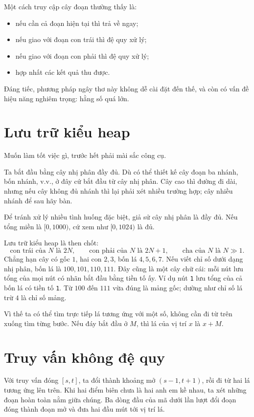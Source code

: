 \documentclass[11pt]{article}
\begin{document}
Một cách truy cập cây đoạn thường thấy là:
\begin{itemize}
  \item nếu cần cả đoạn hiện tại thì trả về ngay;
  \item nếu giao với đoạn con trái thì đệ quy xử lý;
  \item nếu giao với đoạn con phải thì đệ quy xử lý;
  \item hợp nhất các kết quả thu được.
\end{itemize}
Đáng tiếc, phương pháp ngây thơ này không dễ cài đặt đến thế, và còn có vấn đề
hiệu năng nghiêm trọng: hằng số quá lớn.

\section{Lưu trữ kiểu heap}

Muốn làm tốt việc gì, trước hết phải mài sắc công cụ.

Ta bắt đầu bằng cây nhị phân đầy đủ.  Dù có thể thiết kế cây đoạn ba nhánh,
bốn nhánh, v.v., ở đây cứ bắt đầu từ cây nhị phân.  Cây cao thì đường đi dài,
nhưng nếu cây không đủ nhánh thì lại phải xét nhiều trường hợp; cây nhiều nhánh
để sau hãy bàn.

Để tránh xử lý nhiều tình huống đặc biệt, giả sử cây nhị phân là đầy đủ.  Nếu
tổng miền là $[0,1000)$, cứ xem như $[0,1024)$ là đủ.

Lưu trữ kiểu heap là then chốt:
\[
  \text{con trái của }N\text{ là }2N,\qquad
  \text{con phải của }N\text{ là }2N+1,\qquad
  \text{cha của }N\text{ là }N \gg 1.
\]
Chẳng hạn cây có gốc $1$, hai con $2,3$, bốn lá $4,5,6,7$.  Nếu viết chỉ số
dưới dạng nhị phân, bốn lá là $100,101,110,111$.  Đây cũng là một cây chữ cái:
mỗi nút lưu tổng của mọi nút có nhãn bắt đầu bằng tiền tố ấy.  Ví dụ nút
\texttt{1} lưu tổng của cả bốn lá có tiền tố \texttt{1}.  Từ $100$ đến $111$
vừa đúng là mảng gốc; dường như chỉ số lá trừ $4$ là chỉ số mảng.

Vì thế ta có thể tìm trực tiếp lá tương ứng với một số, không cần đi từ trên
xuống tìm từng bước.  Nếu đáy bắt đầu ở $M$, thì lá của vị trí $x$ là $x+M$.

\section{Truy vấn không đệ quy}

Với truy vấn đóng $[s,t]$, ta đổi thành khoảng mở $(s-1,t+1)$, rồi đi từ hai
lá tương ứng lên trên.  Khi hai điểm biên chưa là hai anh em kề nhau, ta xét
những đoạn hoàn toàn nằm giữa chúng.  Ba dòng đầu của mã dưới lần lượt đổi
đoạn đóng thành đoạn mở và đưa hai đầu mút tới vị trí lá.
\end{document}
